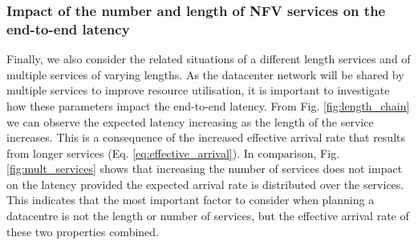 \subsubsection{Impact of the number and length of NFV services on the end-to-end latency}
Finally, we also consider the related situations of a different length services and of multiple services of varying lengths. As the datacenter network will be shared by multiple services to improve resource utilisation, it is important to investigate how these parameters impact the end-to-end latency. From Fig. \ref{fig:length_chain} we can observe the expected latency increasing as the length of the service increases. This is a consequence of the increased effective arrival rate that results from longer services (Eq. \ref{eq:effective_arrival}). In comparison, Fig. \ref{fig:mult_services} shows that increasing the number of services does not impact on the latency provided the expected arrival rate is distributed over the services. This indicates that the most important factor to consider when planning a datacentre is not the length or number of services, but the effective arrival rate of these two properties combined.